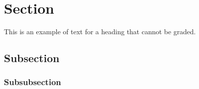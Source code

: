 \section{Section}

This is an example of text for a heading that cannot be graded.

\subsection{Subsection}

\subsubsection{Subsubsection}